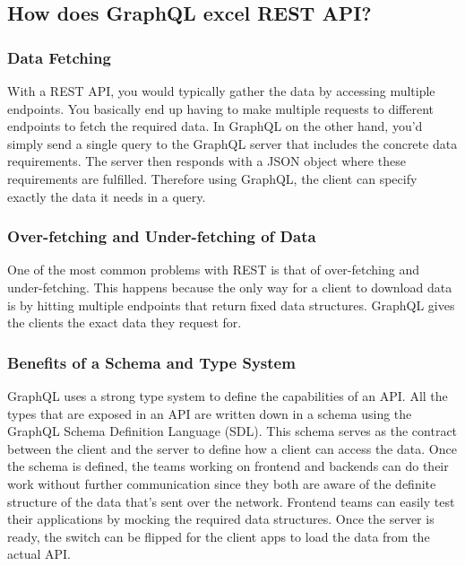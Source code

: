 \subsection{How does GraphQL excel REST API?}

\subsubsection{Data Fetching}

With a REST API, you would typically gather the data by accessing multiple endpoints. You basically 
end up having to make multiple requests to different endpoints to fetch the required data.
In GraphQL on the other hand, you’d simply send a single query to the GraphQL server that 
includes the concrete data requirements. The server then responds with a JSON object where these 
requirements are fulfilled. Therefore using GraphQL, the client can specify exactly the data it needs in a query.

\subsubsection{Over-fetching and Under-fetching of Data}

One of the most common problems with REST is that of over-fetching and under-fetching. This happens 
because the only way for a client to download data is by hitting multiple endpoints that return fixed data structures.
GraphQL gives the clients the exact data they request for.

\subsubsection{Benefits of a Schema and Type System}

GraphQL uses a strong type system to define the capabilities of an API. All the types that are exposed in an API 
are written down in a schema using the GraphQL Schema Definition Language (SDL). This schema serves as the contract 
between the client and the server to define how a client can access the data.
Once the schema is defined, the teams working on frontend and backends can do their work without further communication 
since they both are aware of the definite structure of the data that’s sent over the network.
Frontend teams can easily test their applications by mocking the required data structures. Once the server is ready, 
the switch can be flipped for the client apps to load the data from the actual API.

